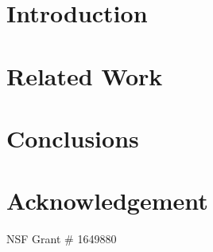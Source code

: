 \documentclass[sigplan,10pt]{acmart}\settopmatter{printfolios=true,printccs=false,printacmref=false}
\begin{document}




\maketitle

\section{Introduction}


\vspace{-10pt}
\section{Related Work}






\section{Conclusions}


\section{Acknowledgement}
NSF Grant \# 1649880

{\footnotesize 
}


%
\end{document}
